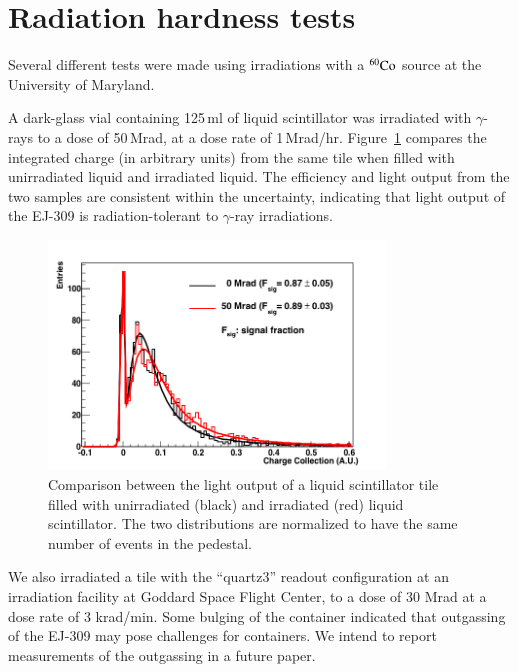 \documentclass[review]{elsarticle}
\begin{document}
\section{Radiation hardness tests}

Several different tests were made using irradiations with a
$\rm{^{60}Co}$ source at the University of Maryland.

A dark-glass vial containing 125\,ml
of liquid scintillator was irradiated with $\gamma$-rays to a
dose of 50\,Mrad, at a dose rate of 1\,Mrad/hr.
Figure~\ref{fig:ej309_irradiated} compares the integrated charge (in arbitrary units)
from the same tile when filled with unirradiated liquid and irradiated liquid.
The efficiency and light output from the two samples are
consistent within the uncertainty, indicating that light output of the EJ-309 is
radiation-tolerant to $\gamma$-ray irradiations.

\begin{figure}[!ht]
\begin{center}
\includegraphics[width=0.8\textwidth]{./figures/RD_R7600_1_0_DBF_ALM_GRS_TH450_100814_all_1.png}
\caption{Comparison between the light output of a liquid scintillator
  tile filled with unirradiated (black) and irradiated (red) liquid
  scintillator. The two distributions are normalized to have the same
  number of events in the pedestal.}
\label{fig:ej309_irradiated}
\end{center}
\end{figure}

We also irradiated a tile with the ``quartz3'' readout configuration
at an irradiation facility at Goddard Space Flight Center, to a dose of 30 Mrad
at a dose rate of 3 krad/min.
Some bulging of the container indicated that outgassing of the EJ-309 
may pose challenges for containers.  We intend to report measurements of the outgassing in a future paper.
\end{document}
